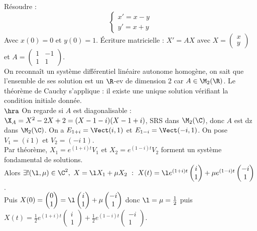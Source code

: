 \documentclass[11pt]{article}
\begin{document}
\vspace*{-0.8cm}

\begin{exercice}{}{}
    Résoudre :
    \begin{equation*}
        \begin{cases}
            x' = x - y \\ y' = x + y
        \end{cases}
    \end{equation*}
    Avec $x(0)=0$ et $y(0)=1$.
    \tcblower
    Écriture matricielle : $X'=AX$ avec $X=\begin{pmatrix}x\\y\end{pmatrix}$ et $A=\begin{pmatrix}1&-1\\1&1\end{pmatrix}$.\\
    On reconnaît un système différentiel linéaire autonome homogène, on sait que l'ensemble de ses solution est un $\R$-ev de dimension 2 car $A\in\M_2(\R)$. Le théorème de Cauchy s'applique : il existe une unique solution vérifiant la condition initiale donnée.\\
    $\hra$ On regarde si $A$ est diagonalisable : $\X_A=X^2-2X+2=(X-1-i)(X-1+i)$, SRS dans $\M_2(\C)$, donc $A$ est dz dans $\M_2(\C)$. On a $E_{1+i}=\Vect(i, 1)$ et $E_{1-i}=\Vect(-i,1)$. On pose $V_1=(i~1)$ et $V_2=(-i~1)$.\\
    Par théorème, $X_1=e^{(1+i)t}V_1$ et $X_2=e^{(1-i)t}V_2$ forment un système fondamental de solutions.\\
    Alors $\exists!(\l,\mu)\in\C^2, ~ X = \l X_1 + \mu X_2 ~ : ~ X(t) = \l e^{(1+i)t}\begin{pmatrix}i\\1\end{pmatrix}+\mu e^{(1-i)t}\begin{pmatrix}-i\\1\end{pmatrix}$.\\
    Puis $X(0)=\begin{pmatrix}0\\1\end{pmatrix}=\l\begin{pmatrix}i\\1\end{pmatrix}+\mu\begin{pmatrix}-i\\1\end{pmatrix}$ donc $\l=\mu=\frac{1}{2}$ puis $X(t)=\frac{1}{2}e^{(1+i)t}\begin{pmatrix}i\\1\end{pmatrix}+\frac{1}{2}e^{(1-i)t}\begin{pmatrix}-i\\1\end{pmatrix}$.\\

\end{exercice}
\end{document}
